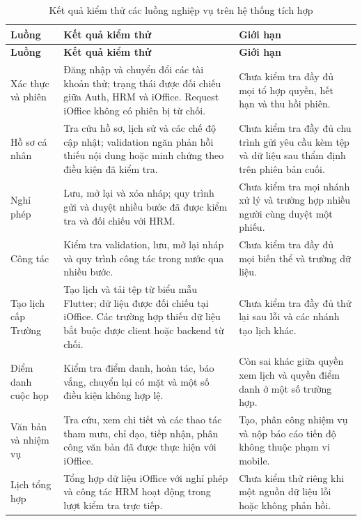\begin{xltabular}{\textwidth}{|L{2.3cm}|Y|Y|}
\caption{Kết quả kiểm thử các luồng nghiệp vụ trên hệ thống tích hợp}\label{tab:ch6_integrated_flows} \\
\hline
\textbf{Luồng} & \textbf{Kết quả kiểm thử} & \textbf{Giới hạn} \\
\hline
\endfirsthead
\hline
\textbf{Luồng} & \textbf{Kết quả kiểm thử} & \textbf{Giới hạn} \\
\hline
\endhead
Xác thực và phiên & Đăng nhập và chuyển đổi các tài khoản thử; trạng thái được đối chiếu giữa Auth, HRM và iOffice. Request iOffice không có phiên bị từ chối. & Chưa kiểm tra đầy đủ mọi tổ hợp quyền, hết hạn và thu hồi phiên. \\
\hline
Hồ sơ cá nhân & Tra cứu hồ sơ, lịch sử và các chế độ cập nhật; validation ngăn phản hồi thiếu nội dung hoặc minh chứng theo điều kiện đã kiểm tra. & Chưa kiểm tra đầy đủ chu trình gửi yêu cầu kèm tệp và dữ liệu sau thẩm định trên phiên bản cuối. \\
\hline
Nghỉ phép & Lưu, mở lại và xóa nháp; quy trình gửi và duyệt nhiều bước đã được kiểm tra và đối chiếu với HRM. & Chưa kiểm tra mọi nhánh xử lý và trường hợp nhiều người cùng duyệt một phiếu. \\
\hline
Công tác & Kiểm tra validation, lưu, mở lại nháp và quy trình công tác trong nước qua nhiều bước. & Chưa kiểm tra đầy đủ mọi biến thể và trường dữ liệu. \\
\hline
Tạo lịch cấp Trường & Tạo lịch và tải tệp từ biểu mẫu Flutter; dữ liệu được đối chiếu tại iOffice. Các trường hợp thiếu dữ liệu bắt buộc được client hoặc backend từ chối. & Chưa kiểm tra đầy đủ thử lại sau lỗi và các nhánh tạo lịch khác. \\
\hline
Điểm danh cuộc họp & Kiểm tra điểm danh, hoàn tác, báo vắng, chuyển lại có mặt và một số điều kiện không hợp lệ. & Còn sai khác giữa quyền xem lịch và quyền điểm danh ở một số trường hợp. \\
\hline
Văn bản và nhiệm vụ & Tra cứu, xem chi tiết và các thao tác tham mưu, chỉ đạo, tiếp nhận, phân công văn bản đã được thực hiện với iOffice. & Tạo, phân công nhiệm vụ và nộp báo cáo tiến độ không thuộc phạm vi mobile. \\
\hline
Lịch tổng hợp & Tổng hợp dữ liệu iOffice với nghỉ phép và công tác HRM hoạt động trong lượt kiểm tra trực tiếp. & Chưa kiểm thử riêng khi một nguồn dữ liệu lỗi hoặc không phản hồi. \\
\hline
\end{xltabular}

